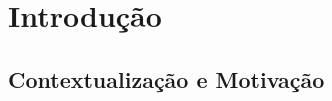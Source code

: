 \documentclass[	12pt, Times, openright, twoside, a4paper, english, brazil]{abntex2}
\begin{document}
\tableofcontents*
\cleardoublepage

\textual

\chapter{Introdução}
\section{Contextualização e Motivação}
\end{document}
